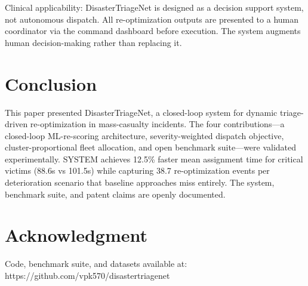 \documentclass[conference]{IEEEtran}
\begin{document}
Clinical applicability: DisasterTriageNet is designed as a decision support system, not autonomous dispatch. All re-optimization outputs are presented to a human coordinator via the command dashboard before execution. The system augments human decision-making rather than replacing it.

\section{Conclusion}

This paper presented DisasterTriageNet, a closed-loop system for dynamic triage-driven re-optimization in mass-casualty incidents. The four contributions---a closed-loop ML-re-scoring architecture, severity-weighted dispatch objective, cluster-proportional fleet allocation, and open benchmark suite---were validated experimentally. SYSTEM achieves 12.5\% faster mean assignment time for critical victims (88.6s vs 101.5s) while capturing 38.7 re-optimization events per deterioration scenario that baseline approaches miss entirely. The system, benchmark suite, and patent claims are openly documented.

\section*{Acknowledgment}

Code, benchmark suite, and datasets available at: https://github.com/vpk570/disastertriagenet
\end{document}
